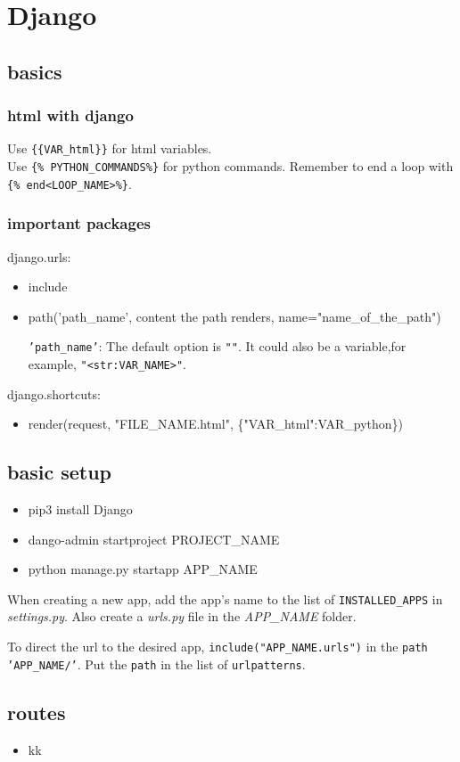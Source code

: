 \documentclass[12,a4paper]{article}
\newcommand{\hN}{\_NAME}
\begin{document}
\section{Django}
\subsection{basics}
	\subsubsection{html with django}
	Use \texttt{\{\{VAR\_html\}\}} for html variables.\\
	Use \texttt{\{\% PYTHON\_COMMANDS\%\}} for python commands. Remember to end a loop with \texttt{\{\% end<LOOP\_NAME>\%\}}.
	\subsubsection{important packages}
	\ttfamily
	django.urls:
	\begin{itemize}
		\item include
		\item path('path\_name', content the path renders, name="name\_of\_the\_path")
		
		\textnormal{
		\texttt{'path\_name'}:
		The default option is \texttt{""}. It could also be a variable,for example, \texttt{"<str:VAR\_NAME>"}.
		}
	\end{itemize}
	django.shortcuts:
	\begin{itemize}
		\item render(request, "FILE\_NAME.html", \{"VAR\_html":VAR\_python\})
	\end{itemize}
	\subsection{basic setup}
	\begin{itemize}
	\ttfamily
		\item pip3 install Django
		\item dango-admin startproject PROJECT\hN
		\item python manage.py startapp APP\hN
	\end{itemize}
	\normalfont
	When creating a new app, add the app's name to the list of \texttt{INSTALLED\_APPS} in \textit{settings.py}. Also create a \textit{urls.py} file in the \textit{APP\hN} folder.
	
	To direct the url to the desired app, \texttt{include("APP\hN.urls")} in the \texttt{path 'APP\hN/'}. Put the \texttt{path} in the list of \texttt{urlpatterns}.		
	\subsection{routes}
		\begin{itemize}
		\item kk
	\end{itemize}
\end{document}
